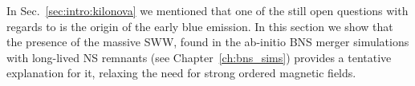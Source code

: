 %
In Sec.~\ref{sec:intro:kilonova} we mentioned that one of the still open 
questions with regards to \AT{} is the origin of the early blue emission. 
%
In this section we show that the presence of the massive \ac{SWW},
found in the ab-initio \ac{BNS} merger simulations with long-lived \ac{NS} remnants 
(see Chapter~\ref{ch:bns_sims}) provides a tentative explanation for it, 
relaxing the need for strong ordered magnetic fields. 


